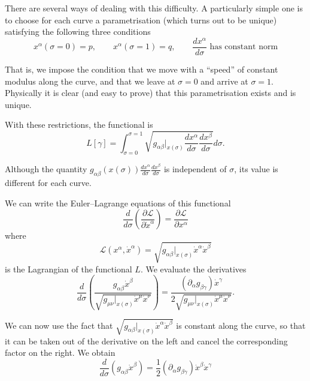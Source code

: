 \begin{points}
\item There are several ways of dealing with this difficulty. A particularly simple one is to choose for each curve a parametrisation (which turns out to be unique) satisfying the following three conditions
\[
  x^\alpha(\sigma=0)=p,\qquad x^\alpha(\sigma=1)=q,\qquad\frac{dx^\alpha}{d\sigma}\text{ has constant norm}
\]

\item That is, we impose the condition that we move with a ``speed'' of constant modulus along the curve, and that we leave at $\sigma=0$ and arrive at $\sigma=1$. Physically it is clear (and easy to prove) that this parametrisation exists and is unique.

\item With these restrictions, the functional is
\[
  L[\gamma]=\int_{\sigma=0}^{\sigma=1}\sqrt{g_{\alpha\beta}|_{x(\sigma)}\frac{dx^\alpha}{d\sigma}\frac{dx^\beta}{d\sigma}}d\sigma .
\]

\item Although the quantity $g_{\alpha\beta}(x(\sigma))\frac{dx^\alpha}{d\sigma}\frac{dx^\beta}{d\sigma}$ is independent of $\sigma$, its value is different for each curve.

\item We can write the Euler--Lagrange equations of this functional
\[
  \frac{d}{d\sigma}\left(\frac{\partial\mathcal L}{\partial\dot x^\alpha}\right)=\frac{\partial\mathcal L}{\partial x^\alpha}
\]
where
\[
  \mathcal L(x^\alpha,\dot x^\alpha)=\sqrt{g_{\alpha\beta}|_{x(\sigma)}\dot x^\alpha\dot x^\beta}
\]
is the Lagrangian of the functional $L$. We evaluate the derivatives
\[
  \frac{d}{d\sigma}\left(\frac{g_{\alpha\beta}\dot x^\beta}{\sqrt{g_{\mu\nu}|_{x(\sigma)}\dot x^\mu\dot x^\nu}}\right)=\frac{(\partial_\alpha g_{\beta\gamma})\dot x^\gamma}{2\sqrt{g_{\mu\nu}|_{x(\sigma)}\dot x^\mu\dot x^\nu}} .
\]

\item We can now use the fact that $\sqrt{g_{\alpha\beta}|_{x(\sigma)}\dot x^\alpha\dot x^\beta}$ is constant along the curve, so that it can be taken out of the derivative on the left and cancel the corresponding factor on the right. We obtain
\[
  \frac{d}{d\sigma}\left(g_{\alpha\beta}\dot x^\beta\right)=\frac12(\partial_\alpha g_{\beta\gamma})\dot x^\beta\dot x^\gamma
\]


\end{points}
